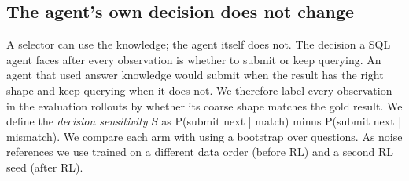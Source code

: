 \begin{table}[t]
\centering\small
{}
\caption{Choosing one of the 16 samples per question (primary questions). The oracle uses the gold result's shape. The contract rows use \armG's most frequent contract per question: for \armA{} they apply the SFT \armG's contracts to another model's samples, and \armG{} after GRPO uses its own.}
\label{tab:select}
\end{table}

\subsection{The agent's own decision does not change}
\label{sec:decisions}
A selector can use the knowledge; the agent itself does not. The decision a SQL agent faces after every observation is whether to submit or keep querying. An agent that used answer knowledge would submit when the result has the right shape and keep querying when it does not. We therefore label every observation in the evaluation rollouts by whether its coarse shape matches the gold result. We define the \emph{decision sensitivity} $S$ as P(submit next | match) minus P(submit next | mismatch). We compare each arm with \armA{} using a bootstrap over questions. As noise references we use \armA{} trained on a different data order (before RL) and a second RL seed (after RL).

